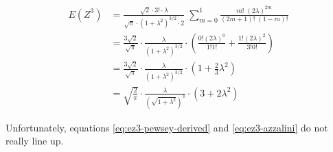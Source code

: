 \documentclass{article}
\begin{document}
\begin{align}
  E(Z^3) &= \frac{\sqrt{2} \cdot 3! \cdot \lambda}{\sqrt{\pi} \cdot (1 + \lambda^2)^{3/2} \cdot 2} \; \sum_{m=0}^1 \frac{m!\;(2\lambda)^{2m}}{(2m + 1)!\;(1 - m)!} \nonumber \\
  &= \frac{3\sqrt{2}}{\sqrt{\pi}} \cdot \frac{\lambda}{(1 + \lambda^2)^{3/2}} \cdot \left( \frac{0! (2\lambda)^0}{1!1!} + \frac{1! (2\lambda)^2}{3!0!} \right) \nonumber \\
  &= \frac{3\sqrt{2}}{\sqrt{\pi}} \cdot \frac{\lambda}{(1 + \lambda^2)^{3/2}} \cdot \left( 1 + \frac{2}{3}\lambda^2 \right) \nonumber \\
  &= \sqrt{\frac{2}{\pi}} \cdot \frac{\lambda}{(\sqrt{1 + \lambda^2})^3} \cdot (3 + 2 \lambda^2) \label{eq:ez3-azzalini}
\end{align}

Unfortunately, equations \eqref{eq:ez3-pewsey-derived} and
\eqref{eq:ez3-azzalini} do not really line up.



\end{document}
